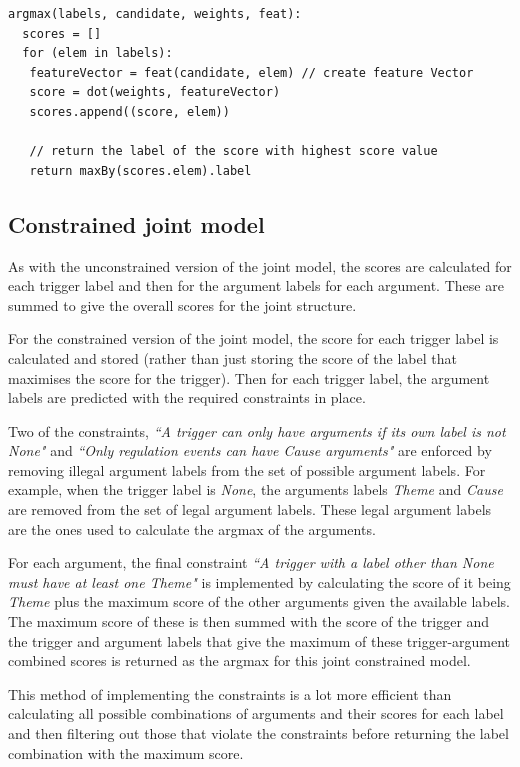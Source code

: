 \documentclass{article} %
\begin{document}
\begin{verbatim}
argmax(labels, candidate, weights, feat):
  scores = []
  for (elem in labels):
   featureVector = feat(candidate, elem) // create feature Vector
   score = dot(weights, featureVector)       
   scores.append((score, elem))

   // return the label of the score with highest score value
   return maxBy(scores.elem).label 
\end{verbatim}

\subsection{Constrained joint model}
As with the unconstrained version of the joint model, the scores are calculated for each trigger label and then for the argument labels for each argument. These are summed to give the overall scores for the joint structure.

For the constrained version of the joint model, the score for each trigger label is calculated and stored (rather than just storing the score of the label that maximises the score for the trigger). Then for each trigger label, the argument labels are predicted with the required constraints in place.

Two of the constraints, \emph{``A trigger can only have arguments if its own label is not None"} and \emph{``Only regulation events can have Cause arguments"} are enforced by removing illegal argument labels from the set of possible argument labels. For example, when the trigger label is \emph{None}, the arguments labels \emph{Theme} and \emph{Cause} are removed from the set of legal argument labels. These legal argument labels are the ones used to calculate the argmax of the arguments.

For each argument, the final constraint 
\emph{``A trigger with a label other than None must have at least one Theme"} is implemented by calculating the score of it being \emph{Theme} plus the maximum score of the other arguments given the available labels. The maximum score of these is then summed with the score of the trigger and the trigger and argument labels that give the maximum of these trigger-argument combined scores is returned as the argmax for this joint constrained model.

This method of implementing the constraints is a lot more efficient than calculating all possible combinations of arguments and their scores for each label and then filtering out those that violate the constraints before returning the label combination with the maximum score.
\end{document}

